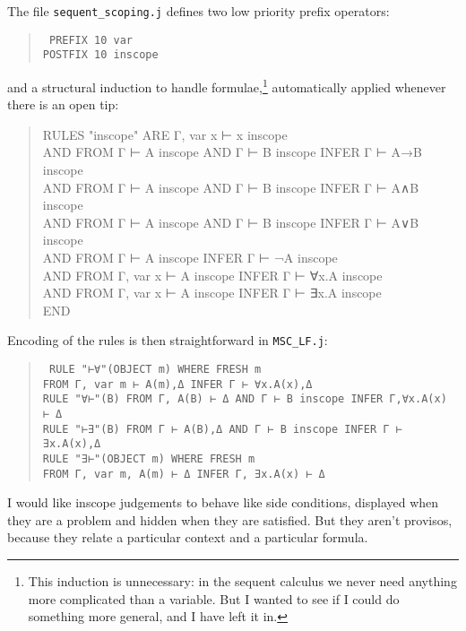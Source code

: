 The file \texttt{sequent\_scoping.j} defines two low priority prefix operators:
\begin{quote}\tt\small
PREFIX  10              var \\
POSTFIX 10              inscope
\end{quote}
and a structural induction to handle formulae,\footnote{This induction is unnecessary: in the sequent calculus we never need anything more complicated than a variable. But I wanted to see if I could do something more general, and I have left it in.} automatically applied whenever there is an open tip:
\begin{quote}\tt\small

RULES "inscope" ARE
\tab       Γ, var x ⊢ x inscope\\
AND     FROM Γ ⊢ A inscope AND Γ ⊢ B inscope INFER Γ ⊢ A→B inscope\\
AND     FROM Γ ⊢ A inscope AND Γ ⊢ B inscope INFER Γ ⊢ A∧B inscope\\
AND     FROM Γ ⊢ A inscope AND Γ ⊢ B inscope INFER Γ ⊢ A∨B inscope\\
AND     FROM Γ ⊢ A inscope INFER Γ ⊢ ¬A inscope\\
AND     FROM Γ, var x ⊢ A inscope INFER Γ ⊢ ∀x.A inscope\\
AND     FROM Γ, var x ⊢ A inscope INFER Γ ⊢ ∃x.A inscope \\
END

\end{quote}

Encoding of the rules is then straightforward in \texttt{MSC\_LF.j}:
\begin{quote}\tt\small
RULE    "⊢∀"(OBJECT m) WHERE FRESH m\\
\tab                    FROM Γ, var m ⊢ A(m),Δ                    INFER Γ ⊢ ∀x.A(x),Δ\\
RULE    "∀⊢"(B)   FROM Γ, A(B) ⊢ Δ AND Γ ⊢ B inscope      INFER Γ,∀x.A(x) ⊢ Δ\\
RULE    "⊢∃"(B)   FROM Γ ⊢ A(B),Δ AND Γ ⊢ B inscope       INFER Γ ⊢ ∃x.A(x),Δ\\
RULE    "∃⊢"(OBJECT m) WHERE FRESH m\\
\tab                    FROM  Γ, var m, A(m) ⊢ Δ                  INFER Γ, ∃x.A(x) ⊢ Δ\\
\end{quote}
I would like inscope judgements to behave like side conditions, displayed when they are a problem and hidden when they are satisfied. But they aren't provisos, because they relate a particular context and a particular formula.


